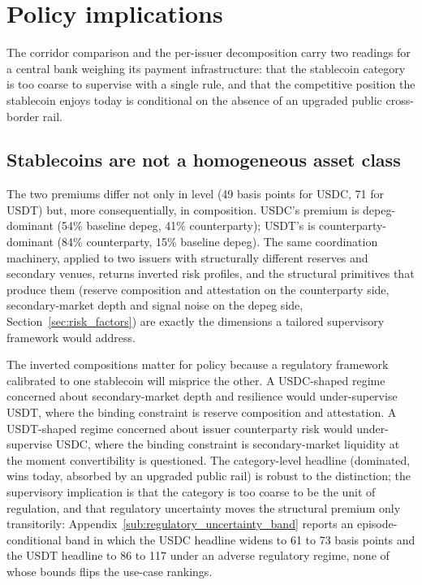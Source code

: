 \section{Policy implications}\label{sec:discussion}

The corridor comparison and the per-issuer decomposition carry two readings for a central bank weighing its payment infrastructure: that the stablecoin category is too coarse to supervise with a single rule, and that the competitive position the stablecoin enjoys today is conditional on the absence of an upgraded public cross-border rail.

\subsection{Stablecoins are not a homogeneous asset class}\label{sub:not_homogeneous}\label{sub:policy_implications}

The two premiums differ not only in level (49 basis points for USDC, 71 for USDT) but, more consequentially, in composition. USDC's premium is depeg-dominant (54\% baseline depeg, 41\% counterparty); USDT's is counterparty-dominant (84\% counterparty, 15\% baseline depeg). The same coordination machinery, applied to two issuers with structurally different reserves and secondary venues, returns inverted risk profiles, and the structural primitives that produce them (reserve composition and attestation on the counterparty side, secondary-market depth and signal noise on the depeg side, Section~\ref{sec:risk_factors}) are exactly the dimensions a tailored supervisory framework would address.

The inverted compositions matter for policy because a regulatory framework calibrated to one stablecoin will misprice the other. A USDC-shaped regime concerned about secondary-market depth and resilience would under-supervise USDT, where the binding constraint is reserve composition and attestation. A USDT-shaped regime concerned about issuer counterparty risk would under-supervise USDC, where the binding constraint is secondary-market liquidity at the moment convertibility is questioned. The category-level headline (dominated, wins today, absorbed by an upgraded public rail) is robust to the distinction; the supervisory implication is that the category is too coarse to be the unit of regulation, and that regulatory uncertainty moves the structural premium only transitorily: Appendix~\ref{sub:regulatory_uncertainty_band} reports an episode-conditional band in which the USDC headline widens to 61 to 73 basis points and the USDT headline to 86 to 117 under an adverse regulatory regime, none of whose bounds flips the use-case rankings.

